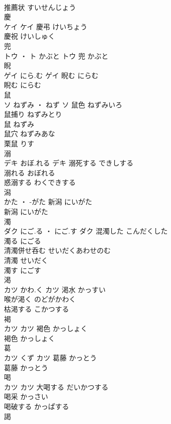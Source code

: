\documentclass[8pt]{extreport}
\begin{document}
\begin{CJK}{UTF8}{min}
\\	推薦状	すいせんじょう	
\\	慶	
\\	ケイ		ケイ	慶弔	けいちょう	
\\	慶祝	けいしゅく	
\\	兜	
\\	トウ ・ ト	かぶと	トウ													兜	かぶと	
\\	睨	
\\	ゲイ	にら.む	ゲイ	睨む	にらむ	
\\	睨む	にらむ	
\\	鼠	
\\	ソ	ねずみ ・ ねず	ソ	鼠色	ねずみいろ	
\\	鼠捕り	ねずみとり	
\\	鼠	ねずみ	
\\	鼠穴	ねずみあな	
\\	栗鼠	りす	
\\	溺	
\\	デキ	おぼ.れる	デキ	溺死する	できしする	
\\	溺れる	おぼれる	
\\	惑溺する	わくできする	
\\	潟	
\\	かた ・ -がた		新潟	にいがた	
\\	新潟	にいがた	
\\	濁	
\\	ダク	にご.る ・ にご.す	ダク	混濁した	こんだくした	
\\	濁る	にごる	
\\	清濁併せ呑む	せいだくあわせのむ	
\\	清濁	せいだく	
\\	濁す	にごす	
\\	渇	
\\	カツ	かわ.く	カツ	渇水	かっすい	
\\	喉が渇く	のどがかわく	
\\	枯渇する	こかつする	
\\	褐	
\\	カツ		カツ	褐色	かっしょく	
\\	褐色	かっしょく	
\\	葛	
\\	カツ	くず	カツ	葛藤	かっとう	
\\	葛藤	かっとう	
\\	喝	
\\	カツ		カツ	大喝する	だいかつする	
\\	喝采	かっさい	
\\	喝破する	かっぱする	
\\	謁	

\end{CJK}
\end{document}
